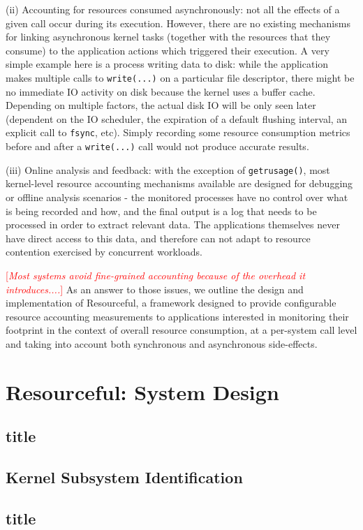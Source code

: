 \documentclass[letterpaper,twocolumn,10pt]{article}
\newcommand{\pname}{Resourceful}
\newcommand{\lnote}[1]{\textcolor{red}{[\textit{#1}]}} %
\begin{document}
(ii) Accounting for resources consumed asynchronously: not all the effects of a given call occur during its execution. However, there are no existing mechanisms for linking asynchronous kernel tasks (together with the resources that they consume) to the application actions which triggered their execution. A very simple example here is a process writing data to disk: while the application makes multiple calls to \texttt{write(...)} on a particular file descriptor, there might be no immediate IO activity on disk because the kernel uses a buffer cache. Depending on multiple factors, the actual disk IO will be only seen later (dependent on the IO scheduler, the expiration of a default flushing interval, an explicit call to \texttt{fsync}, etc). Simply recording some resource consumption metrics before and after a \texttt{write(...)} call would not produce accurate results.

(iii) Online analysis and feedback: with the exception of \texttt{getrusage()}, most kernel-level resource accounting mechanisms available are designed for debugging or offline analysis scenarios - the monitored processes have no control over what is being recorded and how, and the final output is a log that needs to be processed in order to extract relevant data. The applications themselves never have direct access to this data, and therefore can not adapt to resource contention exercised by concurrent workloads.

\lnote{Most systems avoid fine-grained accounting because of the overhead it introduces....}
As an answer to those issues, we outline the design and implementation of \pname, a framework designed to provide configurable resource accounting measurements to applications interested in monitoring their footprint in the context of overall resource consumption, at a per-system call level and taking into account both synchronous and asynchronous side-effects.

\section{Resourceful: System Design}
\subsection{title}
\subsection{Kernel Subsystem Identification}
\subsection{title}
\end{document}
